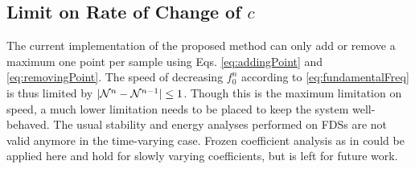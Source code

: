 \subsection{Limit on Rate of Change of $c$}
The current implementation of the proposed method can only add or remove a maximum one point per sample using Eqs. \eqref{eq:addingPoint} and \eqref{eq:removingPoint}. The speed of decreasing $f_0^n$ according to \eqref{eq:fundamentalFreq} is thus limited by $|\mathcal{N}^n - \mathcal{N}^{n-1}| \leq 1$. Though this is the maximum limitation on speed, a much lower limitation needs to be placed to keep the system well-behaved. The usual stability and energy analyses performed on FDSs are not valid anymore in the time-varying case. Frozen coefficient analysis as in \cite{Strikwerda1989} could be applied here and hold for slowly varying coefficients, but is left for future work. 

